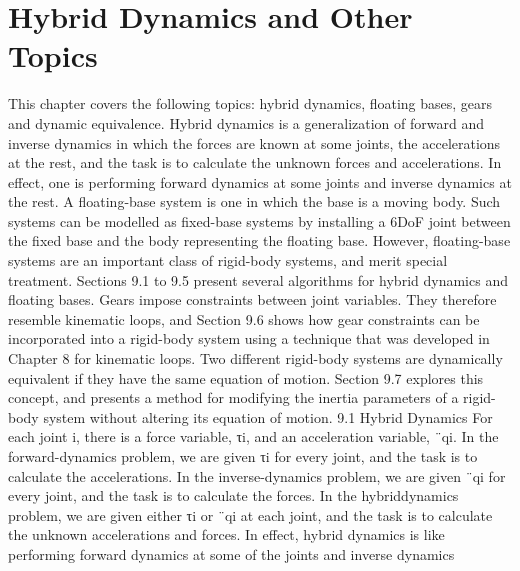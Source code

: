 \chapter{Hybrid Dynamics and Other Topics}
\label{chap:9}
This chapter covers the following topics: hybrid dynamics, floating bases, gears and dynamic equivalence. Hybrid dynamics is a generalization of forward and inverse dynamics in which the forces are known at some joints, the accelerations at the rest, and the task is to calculate the unknown forces and accelerations. In effect, one is performing forward dynamics at some joints and inverse dynamics at the rest. A floating-base system is one in which the base is a moving body. Such systems can be modelled as fixed-base systems by installing a 6DoF joint between the fixed base and the body representing the floating base. However, floating-base systems are an important class of rigid-body systems, and merit special treatment. Sections 9.1 to 9.5 present several algorithms for hybrid dynamics and floating bases. Gears impose constraints between joint variables. They therefore resemble kinematic loops, and Section 9.6 shows how gear constraints can be incorporated into a rigid-body system using a technique that was developed in Chapter 8 for kinematic loops. Two different rigid-body systems are dynamically equivalent if they have the same equation of motion. Section 9.7 explores this concept, and presents a method for modifying the inertia parameters of a rigid-body system without altering its equation of motion. 9.1 Hybrid Dynamics For each joint i, there is a force variable, τi, and an acceleration variable, ¨qi. In the forward-dynamics problem, we are given τi for every joint, and the task is to calculate the accelerations. In the inverse-dynamics problem, we are given ¨qi for every joint, and the task is to calculate the forces. In the hybriddynamics problem, we are given either τi or ¨qi at each joint, and the task is to calculate the unknown accelerations and forces. In effect, hybrid dynamics is like performing forward dynamics at some of the joints and inverse dynamics

